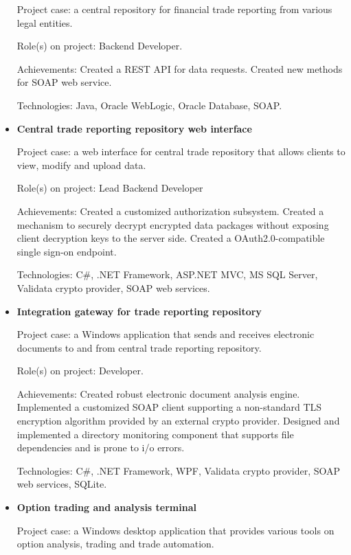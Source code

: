 \documentclass{article}
\begin{document}
\begin{itemize}
{        Project case: a central repository for financial trade reporting from various legal entities.
        
        Role(s) on project: Backend Developer.
        
        Achievements:
        Created a REST API for data requests.
        Created new methods for SOAP web service.
        
        Technologies: Java, Oracle WebLogic, Oracle Database, SOAP.
    }
    \item {
        \textbf{Central trade reporting repository web interface}
        
        Project case: a web interface for central trade repository that allows clients to view, modify and upload data.
        
        Role(s) on project: Lead Backend Developer
        
        Achievements:
        Created a customized authorization subsystem. 
        Created a mechanism to securely decrypt encrypted data packages without exposing client decryption keys to the server side.
        Created a OAuth2.0-compatible single sign-on endpoint.
        
        Technologies: C\#, .NET Framework, ASP.NET MVC, MS SQL Server, Validata crypto provider, SOAP web services.
    }
    \item {
        \textbf{Integration gateway for trade reporting repository}
        
        Project case: a Windows application that sends and receives electronic documents to and from central trade reporting repository.
        
        Role(s) on project: Developer.
        
        Achievements:
        Created robust electronic document analysis engine.
        Implemented a customized SOAP client supporting a non-standard TLS encryption algorithm provided by an external crypto provider.
        Designed and implemented a directory monitoring component that supports file dependencies and is prone to i/o errors.
        
        Technologies: C\#, .NET Framework, WPF, Validata crypto provider, SOAP web services, SQLite.
    }
    \item {
        \textbf{Option trading and analysis terminal}
        
        Project case: a Windows desktop application that provides various tools on option analysis, trading and trade automation.
        
}
\end{itemize}
\end{document}
